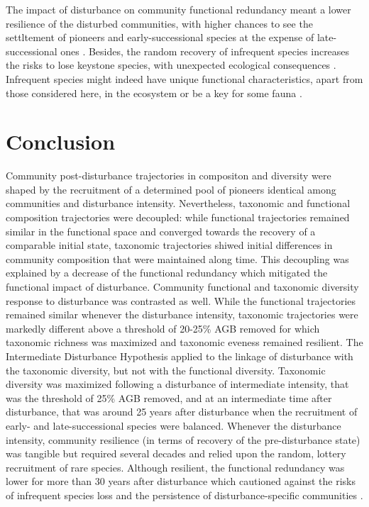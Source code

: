 \documentclass[fleqn,10pt]{ArtEcoFoG} %
\begin{document}
The impact of disturbance on community functional redundancy meant a
lower resilience of the disturbed communities, with higher chances to
see the settltement of pioneers and early-successional species at the
expense of late-successional ones \citep{Haddad2008}. Besides, the
random recovery of infrequent species increases the risks to lose
keystone species, with unexpected ecological consequences
\citep{Jones1994, Chazdon2003a, Diaz2005}. Infrequent species might
indeed have unique functional characteristics, apart from those
considered here, in the ecosystem or be a key for some fauna
\citep{Schleuning2016}.

\section{Conclusion}\label{conclusion}

Community post-disturbance trajectories in compositon and diversity were
shaped by the recruitment of a determined pool of pioneers identical
among communities and disturbance intensity. Nevertheless, taxonomic and
functional composition trajectories were decoupled: while functional
trajectories remained similar in the functional space and converged
towards the recovery of a comparable initial state, taxonomic
trajectories shiwed initial differences in community composition that
were maintained along time. This decoupling was explained by a decrease
of the functional redundancy which mitigated the functional impact of
disturbance. Community functional and taxonomic diversity response to
disturbance was contrasted as well. While the functional trajectories
remained similar whenever the disturbance intensity, taxonomic
trajectories were markedly different above a threshold of 20-25\% AGB
removed for which taxonomic richness was maximized and taxonomic eveness
remained resilient. The Intermediate Disturbance Hypothesis applied to
the linkage of disturbance with the taxonomic diversity, but not with
the functional diversity. Taxonomic diversity was maximized following a
disturbance of intermediate intensity, that was the threshold of 25\%
AGB removed, and at an intermediate time after disturbance, that was
around 25 years after disturbance when the recruitment of early- and
late-successional species were balanced. Whenever the disturbance
intensity, community resilience (in terms of recovery of the
pre-disturbance state) was tangible but required several decades and
relied upon the random, lottery recruitment of rare species. Although
resilient, the functional redundancy was lower for more than 30 years
after disturbance which cautioned against the risks of infrequent
species loss and the persistence of disturbance-specific communities
\citep{Herault2018}.
\end{document}
